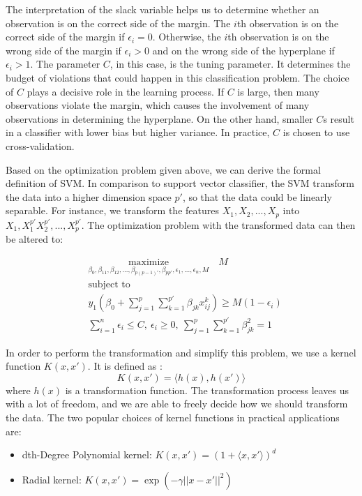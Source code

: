 The interpretation of the slack variable helps us to determine whether an observation is on the correct side of the margin.
The $i$th observation is on the correct side of the margin if $\epsilon_i = 0$. Otherwise, 
the $i$th observation is on the wrong side of the margin if $\epsilon_i > 0$ and on the wrong side of the hyperplane
if $\epsilon_i > 1$. The parameter $C$, in this case, is the tuning parameter. It determines the budget of violations
that could happen in this classification problem. The choice of $C$ plays a decisive role in the learning process.
If $C$ is large, then many observations violate the margin, which causes the involvement of many observations in 
determining the hyperplane. On the other hand, smaller $C$s result in a classifier with lower bias but higher variance.
In practice, $C$ is chosen to use cross-validation. 

Based on the optimization problem given above, we can derive the formal definition of SVM. In comparison to 
support vector classifier, the SVM transform the data into a higher dimension space $p'$, so that the data could be
linearly separable. For instance, we transform the features $X_1, X_2, ..., X_p$ into $X_1, X_1^{p'} X_2^{p'}, ..., X_p^{p'}$.
The optimization problem with the transformed data can then be altered to\cite{R9}: 

\begin{equation}
    \begin{aligned}
      & \underset{\textstyle {\beta_0, \beta_{11}, \beta_{12}, ..., \beta_{p(p-1)'}, \beta_{pp'}, \epsilon_1, ..., \epsilon_n, M}}{\text{maximize}} \quad
        M \\
      & \text{subject to} \\
      & y_1(\beta_0 + \sum_{j=1}^p \sum_{k=1}^{p'} \beta_{jk}x_{ij}^k )\geq M (1-\epsilon_i) \\
      & \sum_{i=1}^n\epsilon_i \leq C,\  \epsilon_i \geq 0, \ \sum_{j=1}^p\sum_{k=1}^{p'}\beta_{jk}^2 = 1
    \end{aligned}
\end{equation}

In order to perform the transformation and simplify this problem, we use a kernel function $K(x, x')$. It is defined as \cite{Elements12}:
\begin{equation}
    K(x, x') = \langle h(x), h(x') \rangle
\end{equation}
where $h(x)$ is a transformation function. 
The transformation process leaves us with a lot of freedom, and we are able to freely decide how we should transform the
data. The two popular choices of kernel functions in practical applications are:
\begin{itemize}
    \item dth-Degree Polynomial kernel: $K(x, x') = (1 + \langle x, x' \rangle)^d$
    \item Radial kernel: $K(x, x') = \exp(-\gamma ||x - x'||^2)$
\end{itemize}

